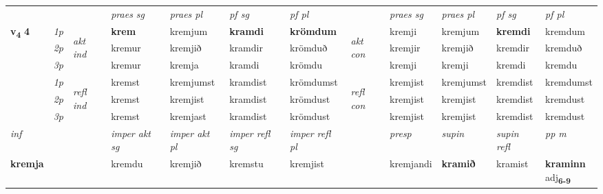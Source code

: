 \begin{longtable}[l]{X>{\footnotesize\itshape}llXXXXlXXXX}
 & &   & \textit{praes sg}  & \textit{praes pl}    & \textit{ pf sg} & \textit{pf pl} & & \textit{praes sg}  & \textit{praes pl}    & \textit{pf sg} & \textit{pf pl }  \\ \cmidrule{4-7} \cmidrule{9-12}
 \multirow{2}{*}{{{\textbf{v{\textsubscript{4}}} \Large{\textbf{4}}}}}  & 1p & \multirow{3}{*}{\begin{turn}{90}\textit{akt ind}\end{turn}} & \textbf{krem} & kremjum & \textbf{kramdi} & \textbf{krömdum} & \multirow{3}{*}{\begin{turn}{90}\textit{akt con}\end{turn}} &kremji & kremjum & \textbf{kremdi} & kremdum\\*
 & 2p &  &  kremur  & kremjið & kramdir & krömduð & & kremjir & kremjið & kremdir & kremduð \\*
 & 3p &  & kremur & kremja & kramdi & krömdu & & kremji & kremji& kremdi & kremdu \\*
\cmidrule{4-7} \cmidrule{9-12}
 & 1p & \multirow{3}{*}{\begin{turn}{90}\textit{refl ind}\end{turn}}  & kremst & kremjumst & kramdist & krömdumst & \multirow{3}{*}{\begin{turn}{90}\textit{refl con}\end{turn}}  &kremjist & kremjumst & kremdist & kremdumst \\*
 & 2p &  & kremst & kremjist & kramdist & krömdust & &kremjist & kremjist & kremdist & kremdust \\*
 & 3p  & & kremst & kremjast & kramdist & krömdust & & kremjist & kremjist& kremdist & kremdust \\*
\cmidrule{4-7} \cmidrule{9-12}

   {\textit{inf}} & &  & \textit{imper akt sg} & \textit{imper akt pl} & \textit{imper refl sg} & \textit{imper refl pl} && \textit{presp} & \textit{supin} & \textit{supin refl} & \textit{pp m} \\*
  {\textbf{kremja}} & && kremdu  & kremjið & kremstu & kremjist && kremjandi &  \textbf{kramið} & kramist & \specialcell{\textbf{kraminn} \\ adj\textbf{\textsubscript{6-9}}} \\*


\end{longtable}
